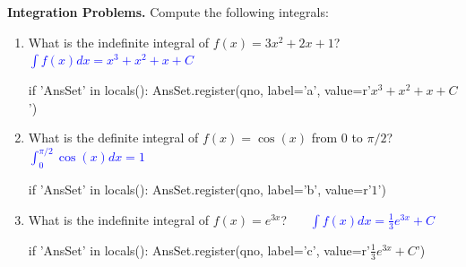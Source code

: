 \textbf{Integration Problems.} Compute the following integrals:
\begin{enumerate}

\item[a.] What is the indefinite integral of \(f(x)=3x^2+2x+1\)?
\ifshowsolutions\ \ \ \textcolor{blue}{\(\int f(x)dx = x^3 + x^2 + x + C\)}
\else
\vspace{1.4cm}
\fi
\begin{pycode}
if 'AnsSet' in locals():
    AnsSet.register(qno, label='a', value=r'\(x^3 + x^2 + x + C\)')
\end{pycode}

\item[b.] What is the definite integral of \(f(x)=\cos(x)\) from \(0\) to \(\pi/2\)?
\ifshowsolutions\ \ \ \textcolor{blue}{\(\int_0^{\pi/2} \cos(x) dx = 1\)}
\else
\vspace{1.4cm}
\fi
\begin{pycode}
if 'AnsSet' in locals():
    AnsSet.register(qno, label='b', value=r'\(1\)')
\end{pycode}

\item[c.] What is the indefinite integral of \(f(x)=e^{3x}\)?
\ifshowsolutions\ \ \ \textcolor{blue}{\(\int f(x)dx = \frac{1}{3} e^{3x} + C\)}
\else
\vspace{1.4cm}
\fi
\begin{pycode}
if 'AnsSet' in locals():
    AnsSet.register(qno, label='c', value=r'\(\frac{1}{3} e^{3x} + C\)')
\end{pycode}

\end{enumerate}
